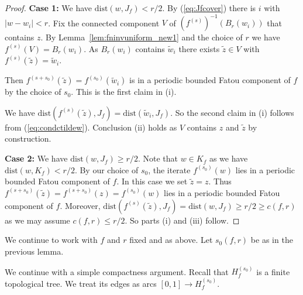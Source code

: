 \documentclass[12pt,oneside,a4]{amsart}
\numberwithin{maincounter}{section}
\numberwithin{equation}{section}
\begin{document}
\begin{proof}
  \textbf{Case 1:} We have $\mathrm{dist}(w,J_f)<r/2$. By
  (\ref{eq:Jfcover}) there is $i$ with $|w-w_i|<r$. Fix the connected
  component $V$ of $(f^{(s)})^{-1}(B_{r}(w_i))$ that contains $z$. By
  Lemma~\ref{lem:fninvuniform_new1} 
  and the choice of $r$ we have
  $f^{(s)}(V) = B_{r}(w_i)$. As $B_{r}(w_i)$ contains $\tilde w_i$ there
  exists $\tilde z\in V$ with $f^{(s)}(\tilde z) = \tilde w_i$.
  
  Then $f^{(s+s_0)}(\tilde z) = f^{(s_0)}(\tilde w_i)$ is in a periodic
  bounded Fatou component of $f$ by the choice of $s_0$. This is the
  first claim in (i).
  
  We have $\mathrm{dist}(f^{(s)}(\tilde z),J_f) =
   \mathrm{dist}(\tilde w_i,J_f)$.
  So the second claim in (i) follows from (\ref{eq:condctildew}). Conclusion (ii) holds as $V$ contains $z$ and $\tilde
  z$ by construction.
    
  \textbf{Case 2:} We have $\mathrm{dist}(w,J_f)\ge r/2$.
  Note that $w\in K_f$ as we have $\mathrm{dist}(w,K_f)< r/2$.  
  By our choice of $s_0$, the
  iterate $f^{(s_0)}(w)$ lies in a periodic bounded Fatou
  component of $f$.  In this case we set $\tilde z = z$.
  Thus $f^{(s+s_0)}(\tilde z) = f^{(s+s_0)}(z) = f^{(s_0)}(w)$
  lies in a periodic bounded Fatou component of $f$.
  Moreover, $\mathrm{dist}(f^{(s)}(\tilde z),J_f) = \mathrm{dist}( w,J_f)\ge
  r /2\ge c(f,r)$ as we may assume $c(f,r)
  \le r/2$. So parts (i) and (iii)
  follow. 
\end{proof}

We continue to work with $f$ and $r$ fixed and as above.
Let $s_0(f,r)$ be as in the
previous lemma.

We continue with a simple compactness argument. Recall that
$H_f^{(s_0)}$ is a finite topological tree. We treat its edges as arcs
$[0,1]\rightarrow H_f^{(s_0)}$.
\end{document}

